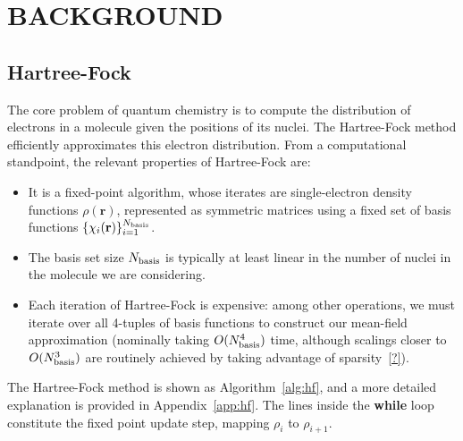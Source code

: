 \documentclass[twoside,11pt]{article}
\begin{document}
\section{BACKGROUND}

\subsection{Hartree-Fock}
The core problem of quantum chemistry is to compute the distribution of electrons in a molecule given the positions of its nuclei.  The Hartree-Fock method efficiently approximates this electron distribution.  From a computational standpoint, the relevant properties of Hartree-Fock are:
\begin{itemize}
\item It is a fixed-point algorithm, whose iterates are single-electron density functions $\rho(\mathbf r)$, represented as symmetric matrices using a fixed set of basis functions $\{\chi_i(\mathbf r)\}_{i=1}^{N_{\rm basis}}$.
\item The basis set size $N_{\rm basis}$ is typically at least linear in the number of nuclei in the molecule we are considering.
\item Each iteration of Hartree-Fock is expensive: among other operations, we must iterate over all 4-tuples of basis functions to construct our mean-field approximation (nominally taking $O(N_{\rm basis}^4)$ time, although scalings closer to $O(N_{\rm basis}^3)$ are routinely achieved by taking advantage of sparsity~\ref{?}).
\end{itemize}
The Hartree-Fock method is shown as Algorithm~\ref{alg:hf}, and a more detailed explanation is provided in Appendix~\ref{app:hf}.  The lines inside the \textbf{while} loop constitute the fixed point update step, mapping $\rho_i$ to $\rho_{i+1}$.
\end{document}
